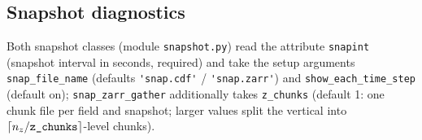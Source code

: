 \documentclass[12pt]{article}
\begin{document}
\subsection*{Snapshot diagnostics}

Both snapshot classes (module \verb|snapshot.py|) read the attribute
\verb|snapint| (snapshot interval in seconds, required) and take the setup
arguments \verb|snap_file_name| (defaults \verb|'snap.cdf'| /
\verb|'snap.zarr'|) and \verb|show_each_time_step| (default on);
\verb|snap_zarr_gather| additionally takes \verb|z_chunks| (default 1:
one chunk file per field and snapshot; larger values split the vertical
into $\lceil n_z/\verb|z_chunks| \rceil$-level chunks).
\end{document}
